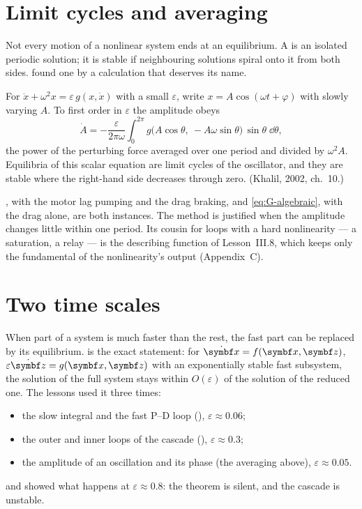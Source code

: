 \section{Limit cycles and averaging}

Not every motion of a nonlinear system ends at an equilibrium. A  is an isolated periodic solution; it is stable if neighbouring solutions spiral onto it from both sides.  found one by a calculation that deserves its name.

\begin{result}
For $\ddot x + \omega^2x = \varepsilon\,g(x, \dot x)$ with a small $\varepsilon$, write $x = A\cos(\omega t + \varphi)$ with slowly varying $A$. To first order in $\varepsilon$ the amplitude obeys
\begin{equation}
  \dot A = -\frac{\varepsilon}{2\pi\omega}\int_0^{2\pi} g\big(A\cos\theta,\ -A\omega\sin\theta\big)\,\sin\theta\;\dd\theta ,
\end{equation}
the power of the perturbing force averaged over one period and divided by $\omega^2A$. Equilibria of this scalar equation are limit cycles of the oscillator, and they are stable where the right-hand side decreases through zero. (Khalil, 2002, ch.~10.)
\end{result}

, with the motor lag pumping and the drag braking, and \cref{eq:G-algebraic}, with the drag alone, are both instances. The method is justified when the amplitude changes little within one period. Its cousin for loops with a hard nonlinearity — a saturation, a relay — is the describing function of Lesson~III.8, which keeps only the fundamental of the nonlinearity's output (Appendix~C).

\section{Two time scales}

When part of a system is much faster than the rest, the fast part can be replaced by its equilibrium.  is the exact statement: for $\dot{\vx} = f(\vx, \symbf z)$, $\varepsilon\dot{\symbf z} = g(\vx, \symbf z)$ with an exponentially stable fast subsystem, the solution of the full system stays within $O(\varepsilon)$ of the solution of the reduced one. The lessons used it three times:
\begin{itemize}
  \item the slow integral and the fast P–D loop (), $\varepsilon \approx 0.06$;
  \item the outer and inner loops of the cascade (), $\varepsilon \approx 0.3$;
  \item the amplitude of an oscillation and its phase (the averaging above), $\varepsilon \approx 0.05$.
\end{itemize}
and  showed what happens at $\varepsilon \approx 0.8$: the theorem is silent, and the cascade is unstable.


